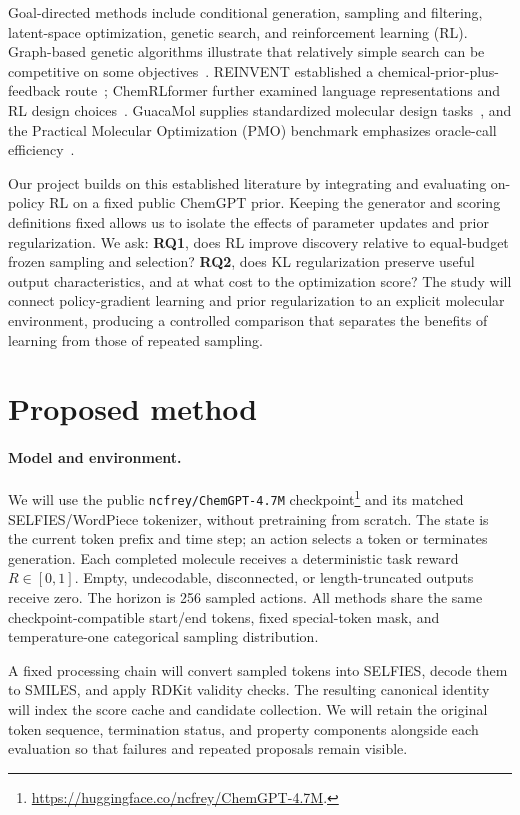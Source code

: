 \documentclass{article}
\begin{document}
Goal-directed methods include conditional generation, sampling and filtering,
latent-space optimization, genetic search, and reinforcement learning (RL).
Graph-based genetic algorithms illustrate that relatively simple search can be
competitive on some objectives~\citep{jensen2019ga}. REINVENT established a
chemical-prior-plus-feedback route~\citep{olivecrona2017reinvent};
ChemRLformer further examined language representations and RL design
choices~\citep{ghugare2024chemrlformer}. GuacaMol supplies standardized molecular
design tasks~\citep{brown2019guacamol}, and the Practical Molecular Optimization
(PMO) benchmark emphasizes oracle-call efficiency~\citep{gao2022pmo}.

Our project builds on this established literature by integrating and evaluating
on-policy RL on a fixed public ChemGPT prior. Keeping the generator and scoring
definitions fixed allows us to isolate the effects of parameter updates and
prior regularization. We ask: \textbf{RQ1}, does RL improve discovery relative
to equal-budget frozen sampling and selection? \textbf{RQ2}, does KL
regularization preserve useful output characteristics, and at what cost to the
optimization score? The study will connect policy-gradient learning and prior
regularization to an explicit molecular environment, producing a controlled
comparison that separates the benefits of learning from those of repeated
sampling.

\section{Proposed method}
\paragraph{Model and environment.}
We will use the public \texttt{ncfrey/ChemGPT-4.7M} checkpoint\footnote{\url{https://huggingface.co/ncfrey/ChemGPT-4.7M}.} and its matched
SELFIES/WordPiece tokenizer, without pretraining from scratch. The state is the
current token prefix and time step; an action selects a token or terminates
generation. Each completed molecule receives a deterministic task reward
$R\in[0,1]$. Empty, undecodable, disconnected, or length-truncated outputs receive
zero. The horizon is 256 sampled actions. All methods share the same
checkpoint-compatible start/end tokens, fixed special-token mask, and
temperature-one categorical sampling distribution.

A fixed processing chain will convert sampled tokens into SELFIES, decode them
to SMILES, and apply RDKit validity checks. The resulting canonical identity
will index the score cache and candidate collection. We will retain the original
token sequence, termination status, and property components alongside each
evaluation so that failures and repeated proposals remain visible.
\end{document}
